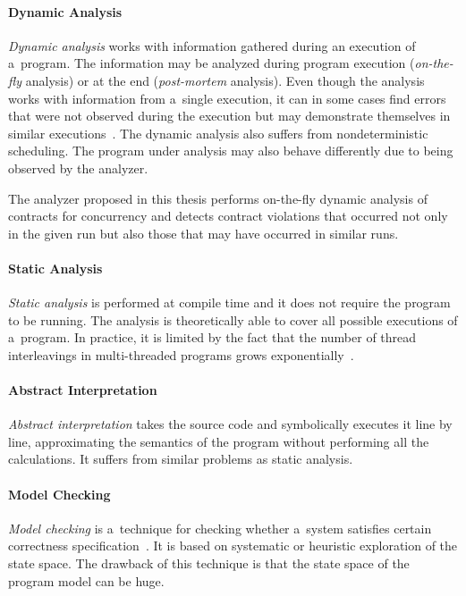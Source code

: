 \paragraph{Dynamic Analysis}
\emph{Dynamic analysis} works with information gathered during an execution of
a~program. The information may be analyzed during program execution
(\emph{on-the-fly} analysis) or at the end (\emph{post-mortem} analysis). Even
though the analysis works with information from a~single execution, it can in
some cases find errors that were not observed during the execution but may
demonstrate themselves in similar executions~\cite{letko}. The dynamic analysis
also suffers from nondeterministic scheduling. The program under analysis may
also behave differently due to being observed by the analyzer.

The analyzer proposed in this thesis performs on-the-fly dynamic analysis of
contracts for concurrency and detects contract violations that occurred not only
in the given run but also those that may have occurred in similar runs.

\paragraph{Static Analysis}
\emph{Static analysis} is performed at compile time and it does not require the
program to be running. The analysis is theoretically able to cover all possible
executions of a~program. In practice, it is limited by the fact that the number
of thread interleavings in multi-threaded programs grows
exponentially~\cite{letko}.

\paragraph{Abstract Interpretation}
\emph{Abstract interpretation} takes the source code and symbolically executes
it line by line, approximating the semantics of the program without performing
all the calculations. It suffers from similar problems as static analysis.

\paragraph{Model Checking}
\emph{Model checking} is a~technique for checking whether a~system satisfies
certain correctness specification~\cite{letko}. It is based on systematic or
heuristic exploration of the state space. The drawback of this technique is that
the state space of the program model can be huge.


